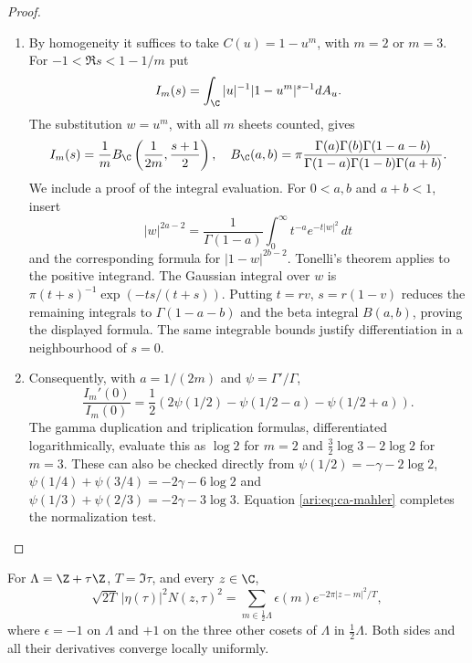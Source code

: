 \begin{proof}
\begin{enumerate}[label=\arabic*.,leftmargin=*]
\item By homogeneity it suffices to take $C(u)=1-u^m$, with $m=2$
or $m=3$. For $-1<\Re s<1-1/m$ put
\[
 I_m(s)=\int_{\C} |u|^{-1}|1-u^m|^{s-1}dA_u.
\]
The substitution $w=u^m$, with all $m$ sheets counted, gives
\[
 I_m(s)=\frac1m B_{\C}\left(\frac1{2m},\frac{s+1}2\right),
 \quad
 B_{\C}(a,b)=\pi\frac{\Gamma(a)\Gamma(b)\Gamma(1-a-b)}
                   {\Gamma(1-a)\Gamma(1-b)\Gamma(a+b)}.
\]
We include a proof of the integral evaluation. For
$0<a,b$ and $a+b<1$, insert
\[
 |w|^{2a-2}=\frac1{\Gamma(1-a)}
       \int_0^\infty t^{-a}e^{-t|w|^2}\,dt
\]
and the corresponding formula for $|1-w|^{2b-2}$.
Tonelli's theorem applies to the positive integrand. The
Gaussian integral over $w$ is
$\pi(t+s)^{-1}\exp(-ts/(t+s))$.
Putting $t=rv$, $s=r(1-v)$ reduces the remaining integrals
to $\Gamma(1-a-b)$ and the beta integral $B(a,b)$, proving
the displayed formula. The same integrable bounds justify
differentiation in a neighbourhood of $s=0$.

\item Consequently, with $a=1/(2m)$ and $\psi=\Gamma'/\Gamma$,
\[
 \frac{I_m'(0)}{I_m(0)}
 =\frac12\left(2\psi(1/2)-\psi(1/2-a)-\psi(1/2+a)\right).
\]
The gamma duplication and triplication formulas, differentiated
logarithmically, evaluate this as $\log2$ for $m=2$ and
$\frac32\log3-2\log2$ for $m=3$. These can also be checked
directly from
$\psi(1/2)=-\gamma-2\log2$,
$\psi(1/4)+\psi(3/4)=-2\gamma-6\log2$ and
$\psi(1/3)+\psi(2/3)=-2\gamma-3\log3$.
Equation \eqref{ari:eq:ca-mahler} completes the normalization test.
\end{enumerate}
\end{proof}

\begin{proposition}\hypertarget{tag-001V}{}\label{ari:C.8.8}

For $\Lambda=\Z+\tau\Z$, $T=\Im\tau$, and every $z\in\C$,
\[
 \sqrt{2T}\,|\eta(\tau)|^2N(z,\tau)^2
 =\sum_{m\in\frac12\Lambda}\epsilon(m)
                         e^{-2\pi|z-m|^2/T},
\]
where $\epsilon=-1$ on $\Lambda$ and $+1$ on the three other
cosets of $\Lambda$ in $\frac12\Lambda$.
Both sides and all their derivatives converge locally uniformly.
\end{proposition}


